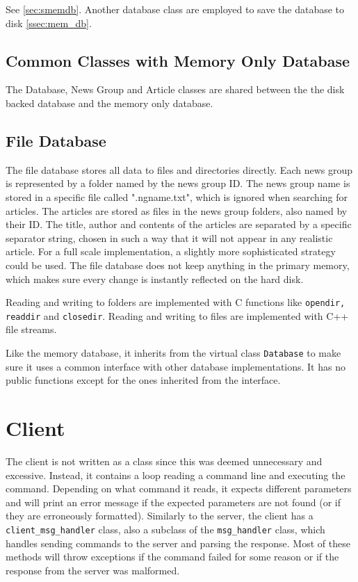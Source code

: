 \documentclass{acmsiggraph}               %
\begin{document}
See \ref{sec:smemdb}. Another database class are employed to save the
database to disk \ref{ssec:mem_db}.

\subsection{Common Classes with Memory Only Database}
\label{ssec:common_classes}
The Database, News Group and Article classes are shared between the the disk backed database
and the memory only database.

\subsection{File Database}
\label{ssec:file_db}
The file database stores all data to files and directories directly. Each news group is represented
by a folder named by the news group ID. The news group name is stored in a specific file called ".ngname.txt",
which is ignored when searching for articles. The articles are stored as files in the news group folders, 
also named by their ID. The title, author and contents of the articles are separated by a specific separator
string, chosen in such a way that it will not appear in any realistic article. For a full scale implementation, a
slightly more sophisticated strategy could be used. The file database does not keep anything in the primary memory, 
which makes sure every change is instantly reflected on the hard disk. 

Reading and writing to folders are implemented with C functions like \texttt{opendir, readdir} and \texttt{closedir}.
Reading and writing to files are implemented with C++ file streams. 

Like the memory database, it inherits from the virtual class \texttt{Database} to make sure it uses a common 
interface with other database implementations. It has no public functions except for the ones inherited
from the interface.


\section{Client}
\label{sec:client}
The client is not written as a class since this was deemed unnecessary and
excessive. Instead, it contains a loop reading a command line and executing the
command. Depending on what command it reads, it expects different parameters
and will print an error message if the expected parameters are not found (or if
they are erroneously formatted). Similarly to the server, the client has a
\verb|client_msg_handler| class, also a subclass of the \verb|msg_handler|
class, which handles sending commands to the server and parsing the response.
Most of these methods will throw exceptions if the command failed for some
reason or if the response from the server was malformed.
\end{document}
